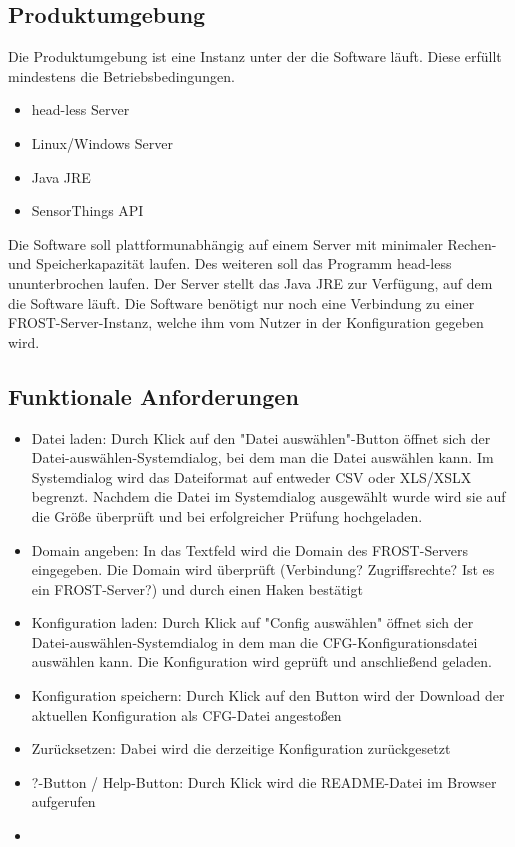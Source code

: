 \documentclass[12 pt]{article}
\begin{document}
\subsection{Produktumgebung}
Die Produktumgebung ist eine Instanz unter der die Software läuft. Diese erfüllt mindestens die Betriebsbedingungen.
\begin{itemize}
\item head-less Server
\item Linux/Windows Server
\item Java JRE
\item SensorThings API
\end{itemize}
Die Software soll plattformunabhängig auf einem Server mit minimaler Rechen- und Speicherkapazität laufen. Des weiteren soll das Programm head-less ununterbrochen laufen. Der Server stellt das Java JRE zur Verfügung, auf dem die Software läuft. Die Software benötigt nur noch eine Verbindung zu einer FROST-Server-Instanz, welche ihm vom Nutzer in der Konfiguration gegeben wird.

\subsection{Funktionale Anforderungen}
\begin{itemize}
\item Datei laden: Durch Klick auf den "Datei auswählen"-Button öffnet sich der Datei-auswählen-Systemdialog, bei dem man die Datei auswählen kann. Im Systemdialog wird das Dateiformat auf entweder CSV oder XLS/XSLX begrenzt. Nachdem die Datei im Systemdialog ausgewählt wurde wird sie auf die Größe überprüft und bei erfolgreicher Prüfung  hochgeladen.
\item Domain angeben: In das Textfeld wird die Domain des FROST-Servers eingegeben. Die Domain wird überprüft (Verbindung? Zugriffsrechte? Ist es ein FROST-Server?) und durch einen Haken bestätigt
\item Konfiguration laden: Durch Klick auf "Config auswählen" öffnet sich der Datei-auswählen-Systemdialog in dem man die CFG-Konfigurationsdatei auswählen kann. Die Konfiguration wird geprüft und anschließend geladen.
\item Konfiguration speichern: Durch Klick auf den Button wird der Download der aktuellen Konfiguration als CFG-Datei angestoßen
\item Zurücksetzen: Dabei wird die derzeitige Konfiguration zurückgesetzt

\item ?-Button / Help-Button: Durch Klick wird die README-Datei im Browser aufgerufen
\item 
\end{itemize}
\end{document}

